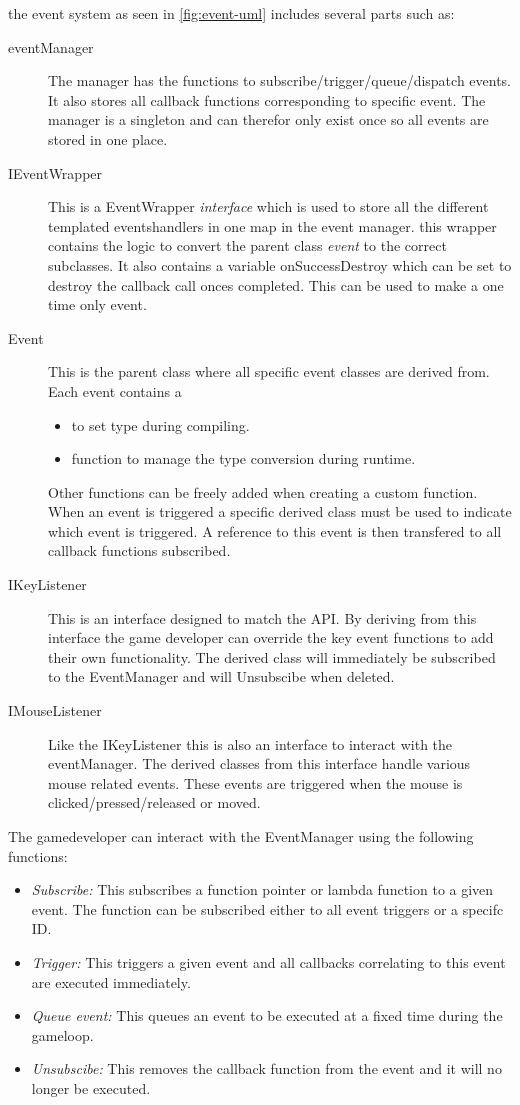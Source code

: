 \documentclass{projdoc}
\begin{document}
the event system as seen in \ref{fig:event-uml} includes several parts such as:
\begin{description}
	\item[eventManager] The manager has the functions to subscribe/trigger/queue/dispatch events. It also stores all callback functions corresponding to specific event.
	The manager is a singleton and can therefor only exist once so all events are stored in one place.
	\item[IEventWrapper] This is a EventWrapper \emph{interface} which is used to store all the different templated eventshandlers in one map in the event manager.
	this wrapper contains the logic to convert the parent class \emph{event} to the correct subclasses. It also contains a variable onSuccessDestroy which can be set to destroy the callback call onces completed.
	This can be used to make a one time only event.
	\item[Event] This is the parent class where all specific event classes are derived from. Each event contains a
	\begin{itemize}
		\item \emph{} to set type during compiling.
		\item \emph{} function to manage the type conversion during runtime.
	\end{itemize}
	Other functions can be freely added when creating a custom function.
	When an event is triggered a specific derived class must be used to indicate which event is triggered. A reference to this event is then transfered to all callback functions subscribed.
	\item[IKeyListener] This is an interface designed to match the API. By deriving from this interface the game developer can override the key event functions to add their own functionality.
	The derived class will immediately be subscribed to the EventManager and will Unsubscibe when deleted.
	\item[IMouseListener] Like the IKeyListener this is also an interface to interact with the eventManager. The derived classes from this interface handle various mouse related events.
	These events are triggered when the mouse is clicked/pressed/released or moved.
\end{description}
The gamedeveloper can interact with the EventManager using the following functions:
\begin{itemize}
	\item \emph{Subscribe:} This subscribes a function pointer or lambda function to a given event. The function can be subscribed either to all event triggers or a specifc ID.
	\item \emph{Trigger:} This triggers a given event and all callbacks correlating to this event are executed immediately.
	\item \emph{Queue event:} This queues an event to be executed at a fixed time during the gameloop.
	\item \emph{Unsubscibe:} This removes the callback function from the event and it will no longer be executed.
\end{itemize}
\end{document}
